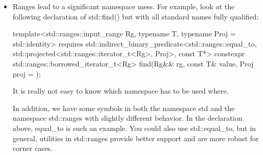 \begin{itemize}
\item
Ranges lead to a significant namespace mess. For example, look at the following declaration of std::find() but with all standard names fully qualified:

\begin{cpp}
template<std::ranges::input_range Rg,
				typename T,
				typename Proj = std::identity>
requires std::indirect_binary_predicate<std::ranges::equal_to,
									std::projected<std::ranges::iterator_t<Rg>, Proj>,
									const T*>
constexpr std::ranges::borrowed_iterator_t<Rg>
	find(Rg&& rg, const T& value, Proj proj = {});
\end{cpp}

It is really not easy to know which namespace has to be used where.

In addition, we have some symbols in both the namespace std and the namespace std::ranges with slightly different behavior. In the declaration above, equal\_to is such an example. You could also use std::equal\_to, but in general, utilities in std::ranges provide better support and are more robust for corner cases.
\end{itemize}














